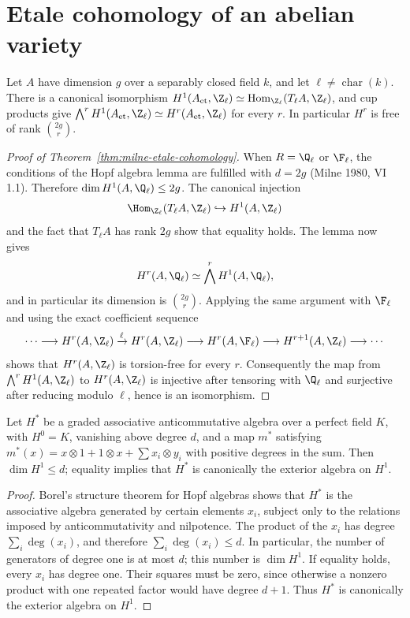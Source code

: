 \section{Etale cohomology of an abelian variety}
\begin{theorem}\label{thm:milne-etale-cohomology}
Let $A$ have dimension $g$ over a separably closed field $k$, and let $\ell\ne\operatorname{char}(k)$. There is a canonical isomorphism $H^1(A_{\rm et},\Z_\ell)\simeq\operatorname{Hom}_{\Z_\ell}(T_\ell A,\Z_\ell)$, and cup products give $\bigwedge^rH^1(A_{\rm et},\Z_\ell)\simeq H^r(A_{\rm et},\Z_\ell)$ for every $r$. In particular $H^r$ is free of rank $\binom{2g}{r}$.
\end{theorem}
\begin{proof}[Proof of Theorem~\ref{thm:milne-etale-cohomology}]
When $R=\Q_\ell$ or $\F_\ell$, the conditions of the Hopf algebra lemma are
fulfilled with $d=2g$ (Milne 1980, VI 1.1).  Therefore
$\dim H^1(A,\Q_\ell)\leq2g$.  The canonical injection
\[
\Hom_{\Z_\ell}(T_\ell A,\Z_\ell)\hookrightarrow H^1(A,\Z_\ell)
\]
and the fact that $T_\ell A$ has rank $2g$ show that equality holds.  The
lemma now gives
\[
H^r(A,\Q_\ell)\simeq\bigwedge^rH^1(A,\Q_\ell),
\]
and in particular its dimension is $\binom{2g}{r}$.  Applying the same
argument with $\F_\ell$ and using the exact coefficient sequence
\[
\cdots\longrightarrow H^r(A,\Z_\ell)\xrightarrow{\ell}
H^r(A,\Z_\ell)\longrightarrow H^r(A,\F_\ell)
\longrightarrow H^{r+1}(A,\Z_\ell)\longrightarrow\cdots
\]
shows that $H^r(A,\Z_\ell)$ is torsion-free for every $r$.  Consequently the
map from $\bigwedge^rH^1(A,\Z_\ell)$ to $H^r(A,\Z_\ell)$ is injective after
tensoring with $\Q_\ell$ and surjective after reducing modulo $\ell$, hence is
an isomorphism.
\end{proof}
\begin{lemma}\label{lem:milne-etale-hopf}
Let $H^*$ be a graded associative anticommutative algebra over a perfect field $K$, with $H^0=K$, vanishing above degree $d$, and a map $m^*$ satisfying $m^*(x)=x\otimes1+1\otimes x+\sum x_i\otimes y_i$ with positive degrees in the sum. Then $\dim H^1\le d$; equality implies that $H^*$ is canonically the exterior algebra on $H^1$.
\end{lemma}

\begin{proof}
Borel's structure theorem for Hopf algebras shows that $H^*$ is the
associative algebra generated by certain elements $x_i$, subject only to the
relations imposed by anticommutativity and nilpotence.  The product of the
$x_i$ has degree $\sum_i\deg(x_i)$, and therefore $\sum_i\deg(x_i)\leq d$.
In particular, the number of generators of degree one is at most $d$; this
number is $\dim H^1$.  If equality holds, every $x_i$ has degree one.  Their
squares must be zero, since otherwise a nonzero product with one repeated
factor would have degree $d+1$.  Thus $H^*$ is canonically the exterior
algebra on $H^1$.
\end{proof}


